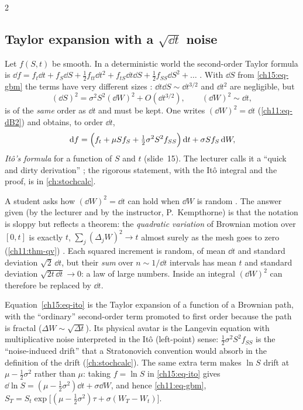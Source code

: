 \begin{paracol}{2}
\subsection{Taylor expansion with a $\sqrt{\dd t}$ noise}
Let $f(S,t)$ be smooth. In a deterministic world the second-order Taylor formula is
$\dd f=f_t\dd t+f_S\dd S+\tfrac12f_{tt}\dd t^2+f_{tS}\dd t\dd S+\tfrac12f_{SS}\dd S^2+\dots$ . With $\dd S$ from \eqref{ch15:eq-gbm} the terms have very
different sizes : $\dd t\dd S\sim\dd t^{3/2}$ and $\dd t^2$ are negligible, but
\[
  (\dd S)^2=\sigma^2S^2(\dd W)^2+O(\dd t^{3/2}),\qquad(\dd W)^2\sim\dd t,
\]
is of the \emph{same} order as $\dd t$ and must be kept. One writes $(\dd W)^2=\dd t$ (\cref{ch11:eq-dB2}) and obtains, to order $\dd t$,
\begin{equation}\label{ch15:eq-ito}
  \,\mathrm{d} f=\Bigl(f_t+\mu Sf_S+\tfrac12\sigma^2S^2f_{SS}\Bigr)\,\mathrm{d} t+\sigma Sf_S\,\mathrm{d} W,
\end{equation}
\emph{It\^o's formula} for a function of $S$ and $t$ (slide~15). The lecturer calls it a ``quick and dirty derivation'' ; the
rigorous statement, with the It\^o integral and the proof, is in \cref{ch:stochcalc}.

\begin{coursenote}
A student asks how $(\dd W)^2=\dd t$ can hold when $\dd W$ is random . The answer given (by the lecturer and by the instructor, P.~Kempthorne) is that
the notation is sloppy but reflects a theorem: the \emph{quadratic variation} of Brownian motion over $[0,t]$ is exactly $t$,
$\sum_j(\Delta_jW)^2\to t$ almost surely as the mesh goes to zero (\cref{ch11:thm-qv}) . Each squared increment is random, of mean $\dd t$
and standard deviation $\sqrt2\,\dd t$, but their \emph{sum} over $n\sim1/\dd t$ intervals has mean $t$ and standard deviation
$\sqrt{2t\,\dd t}\to0$: a law of large numbers. Inside an integral $(\dd W)^2$ can therefore be replaced by $\dd t$.
\end{coursenote}

\begin{intuition}
Equation~\eqref{ch15:eq-ito} is the Taylor expansion of a function of a Brownian path, with the ``ordinary'' second-order term promoted to first order
because the path is fractal ($\Delta W\sim\sqrt{\Delta t}$). Its physical avatar is the Langevin equation with multiplicative noise interpreted in the It\^o
(left-point) sense: $\tfrac12\sigma^2S^2f_{SS}$ is the ``noise-induced drift'' that a Stratonovich convention would absorb in the definition of the drift
(\cref{ch:stochcalc}). The same extra term makes $\ln S$ drift at $\mu-\tfrac12\sigma^2$ rather than $\mu$: taking $f=\ln S$ in \eqref{ch15:eq-ito}
gives $\dd\ln S=(\mu-\tfrac12\sigma^2)\dd t+\sigma\dd W$, and hence \cref{ch11:eq-gbm},
$S_T=S_t\exp\bigl[(\mu-\tfrac12\sigma^2)\tau+\sigma(W_T-W_t)\bigr]$.
\end{intuition}


\end{paracol}
